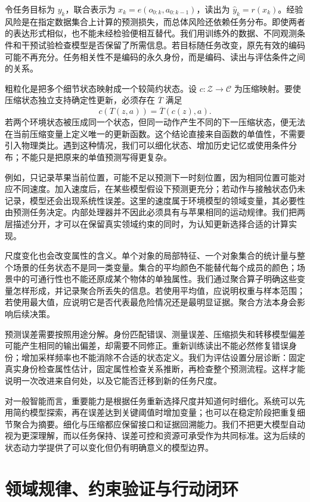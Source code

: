 令任务目标为 $y_k$，联合表示为 $x_k=e(o_{0:k},a_{0:k-1})$，读出为 $\widehat y_k=r(x_k)$。经验风险是在指定数据集合上计算的预测损失，而总体风险还依赖任务分布。即使两者的表达形式相似，也不能未经检验便相互替代。我们用训练外的数据、不同观测条件和干预试验检查模型是否保留了所需信息。若目标随任务改变，原先有效的编码可能不再充分。任务相关性不是编码的永久身份，而是编码、读出与评估条件之间的关系。

粗粒化是把多个细节状态映射成一个较简约状态。设 $c:\mathcal Z\to\mathcal C$ 为压缩映射。要使压缩状态独立支持确定性更新，必须存在 $\overline T$ 满足
\begin{equation}
c(T(z,a))=\overline T(c(z),a).
\end{equation}
若两个环境状态被压成同一个状态，但同一动作产生不同的下一压缩状态，便无法在当前压缩变量上定义唯一的更新函数。这个结论直接来自函数的单值性，不需要引入物理类比。遇到这种情况，我们可以细化状态、增加历史记忆或使用条件分布；不能只是把原来的单值预测写得更复杂。

例如，只记录苹果当前位置，可能不足以预测下一时刻位置，因为相同位置可能对应不同速度。加入速度后，在某些模型假设下预测更充分；若动作与接触状态仍未记录，模型还会出现系统性误差。这里的速度属于环境模型的领域变量，其必要性由预测任务决定。内部处理器并不因此必须具有与苹果相同的运动规律。我们把两层描述分开，才可以在保留真实领域约束的同时，为认知更新选择合适的计算实现。

尺度变化也会改变属性的含义。单个对象的局部特征、一个对象集合的统计量与整个场景的任务状态不是同一类变量。集合的平均颜色不能替代每个成员的颜色；场景中的可通行性也不能还原成某个物体的单独属性。我们通过聚合算子明确这些变量怎样形成，并记录聚合所丢失的信息。若使用平均值，应说明权重与样本范围；若使用最大值，应说明它是否代表最危险情况还是最明显证据。聚合方法本身会影响后续决策。

预测误差需要按照用途分解。身份匹配错误、测量误差、压缩损失和转移模型偏差可能产生相同的输出偏差，却需要不同修正。重新训练读出不能必然修复错误身份；增加采样频率也不能消除不合适的状态定义。我们为评估设置分层诊断：固定真实身份检查属性估计，固定属性检查关系推断，再检查整个预测流程。这样才能说明一次改进来自何处，以及它能否迁移到新的任务尺度。

对一般智能而言，重要能力是根据任务重新选择尺度并知道何时细化。系统可以先用简约模型探索，再在误差达到关键阈值时增加变量；也可以在稳定阶段把重复细节聚合为摘要。细化与压缩都应保留接口和证据回溯能力。我们不把更大模型自动视为更深理解，而以任务保持、误差可控和资源可承受作为共同标准。这为后续的状态动力学提供了可以变化但仍有明确意义的模型边界。

\section{领域规律、约束验证与行动闭环}
\label{sec:mirror_table}

